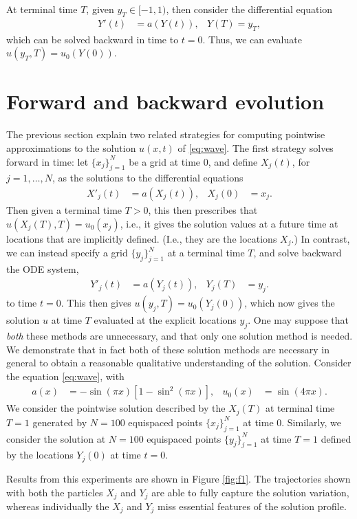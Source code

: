 \documentclass[11pt]{amsart}
\begin{document}
  At terminal time $T$, given $y_T \in [-1,1)$, then consider the differential equation
  \begin{align*}
    Y'(t) &= a(Y(t)), & Y(T) = y_T,
  \end{align*}
  which can be solved backward in time to $t = 0$. Thus, we can evaluate $u(y_T, T) = u_0(Y(0))$. 

  \section{Forward and backward evolution}
  The previous section explain two related strategies for computing pointwise approximations to the solution $u(x,t)$ of \eqref{eq:wave}. The first strategy solves forward in time: let $\{x_j\}_{j=1}^N$ be a grid at time 0, and define $X_j(t)$, for $j = 1, \ldots, N$, as the solutions to the differential equations
  \begin{align}\label{eq:Xj}
    X'_j(t) &= a(X_j(t)), & X_j(0) &= x_j.
  \end{align}
  Then given a terminal time $T > 0$, this then prescribes that $u(X_j(T), T) = u_0(x_j)$, i.e., it gives the solution values at a future time at locations that are implicitly defined. (I.e., they are the locations $X_j$.) In contrast, we can instead specify a grid $\{y_j\}_{j=1}^N$ at a terminal time $T$, and solve backward the ODE system,
  \begin{align}\label{eq:Yj}
    Y'_j(t) &= a(Y_j(t)), & Y_j(T) &= y_j.
  \end{align}
  to time $t = 0$. This then gives $u(y_j, T) = u_0(Y_j(0))$, which now gives the solution $u$ at time $T$ evaluated at the explicit locations $y_j$. One may suppose that \textit{both} these methods are unnecessary, and that only one solution method is needed. We demonstrate that in fact both of these solution methods are necessary in general to obtain a reasonable qualitative understanding of the solution. Consider the equation \eqref{eq:wave}, with 
  \begin{align}\label{eq:au0-1}
    a(x) &= -\sin(\pi x) \left[ 1 - \sin^2(\pi x)\right], & u_0(x) &= \sin(4\pi x).
  \end{align}
  We consider the pointwise solution described by the $X_j(T)$ at terminal time $T = 1$ generated by $N = 100$ equispaced points $\{x_j\}_{j=1}^N$ at time 0. Similarly, we consider the solution at $N = 100$ equispaced points $\{y_j\}_{j=1}^N$ at time $T = 1$ defined by the locations $Y_j(0)$ at time $t = 0$. 

  Results from this experiments are shown in Figure \ref{fig:f1}. The trajectories shown with both the particles $X_j$ and $Y_j$ are able to fully capture the solution variation, whereas individually the $X_j$ and $Y_j$ miss essential features of the solution profile. 
\end{document}
